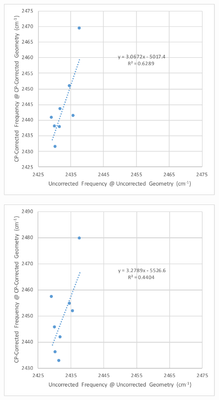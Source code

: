 \documentclass{article}
\begin{document}
\begin{figure}
  \centering
  \includegraphics{./002_2_3.pdf}
\end{figure}

\begin{figure}
  \centering
  \includegraphics{./002_2_4.pdf}
\end{figure}
\end{document}
